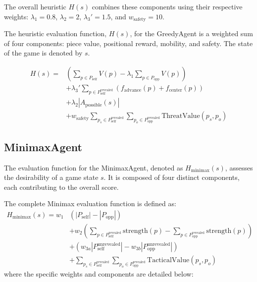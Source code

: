 \documentclass{article}
\begin{document}
The overall heuristic $H(s)$ combines these components using their respective weights: $\lambda_1=0.8$, $\lambda_2=2$, $\lambda_3'=1.5$, and $w_{\text{safety}}=10$.

The heuristic evaluation function, $H(s)$, for the GreedyAgent is a weighted sum of four components: piece value, positional reward, mobility, and safety. The state of the game is denoted by $s$.

\begin{equation}
\label{eq:total_heuristic}
\begin{split}
H(s) = & \left( \sum_{p \in P_{\text{self}}} V(p) - \lambda_1 \sum_{p \in P_{\text{opp}}} V(p) \right) \\
& + \lambda_3' \sum_{p \in P_{\text{self}}^{\text{revealed}}} \left( f_{\text{advance}}(p) + f_{\text{center}}(p) \right) \\
& + \lambda_2 |A_{\text{possible}}(s)| \\
& + w_{\text{safety}} \sum_{p_s \in P_{\text{self}}^{\text{revealed}}} \sum_{p_o \in P_{\text{opp}}^{\text{revealed}}} \text{ThreatValue}(p_s, p_o)
\end{split}
\end{equation}




\subsection{MinimaxAgent}
The evaluation function for the MinimaxAgent, denoted as $H_{\text{minimax}}(s)$, assesses the desirability of a game state $s$. It is composed of four distinct components, each contributing to the overall score.

The complete Minimax evaluation function is defined as:
\begin{equation}
\label{eq:minimax_total_heuristic}
\begin{split}
H_{\text{minimax}}(s) = w_1 & (|P_{\text{self}}| - |P_{\text{opp}}|) \\
& + w_2 \left(\sum_{p \in P_{\text{self}}^{\text{revealed}}} \text{strength}(p) - \sum_{p \in P_{\text{opp}}^{\text{revealed}}} \text{strength}(p)\right) \\
& + \left( w_{3a} |P_{\text{self}}^{\text{unrevealed}}| - w_{3b} |P_{\text{opp}}^{\text{unrevealed}}| \right) \\
& + \sum_{p_s \in P_{\text{self}}^{\text{revealed}}} \sum_{p_o \in P_{\text{opp}}^{\text{revealed}}} \text{TacticalValue}(p_s, p_o)
\end{split}
\end{equation}
where the specific weights and components are detailed below:
\end{document}
